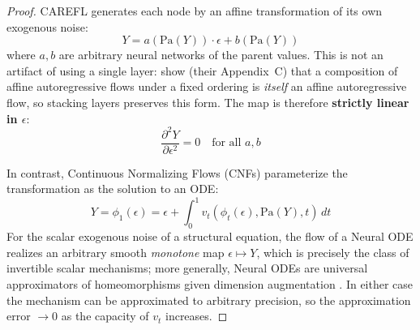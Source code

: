 \begin{proof}
CAREFL generates each node by an affine transformation of its own exogenous noise:
\begin{equation}
    Y = a(\mathrm{Pa}(Y)) \cdot \epsilon + b(\mathrm{Pa}(Y))
\end{equation}
where $a, b$ are arbitrary neural networks of the parent values. This is not an artifact of using a single layer: \citet{khemakhem2021causal} show (their Appendix~C) that a composition of affine autoregressive flows under a fixed ordering is \emph{itself} an affine autoregressive flow, so stacking layers preserves this form. The map is therefore \textbf{strictly linear in $\epsilon$}:
\begin{equation}
    \frac{\partial^2 Y}{\partial \epsilon^2} = 0 \quad \text{for all } a, b
\end{equation}


In contrast, Continuous Normalizing Flows (CNFs) parameterize the transformation as the solution to an ODE:
\begin{equation}
    Y = \phi_1(\epsilon) = \epsilon + \int_0^1 v_t(\phi_t(\epsilon), \mathrm{Pa}(Y), t) \, dt
\end{equation}
For the scalar exogenous noise of a structural equation, the flow of a Neural ODE realizes an arbitrary smooth \emph{monotone} map $\epsilon \mapsto Y$, which is precisely the class of invertible scalar mechanisms; more generally, Neural ODEs are universal approximators of homeomorphisms given dimension augmentation \citep{zhang2020approximationcapabilitiesneuralodes}. In either case the mechanism can be approximated to arbitrary precision, so the approximation error $\to 0$ as the capacity of $v_t$ increases.
\end{proof}

